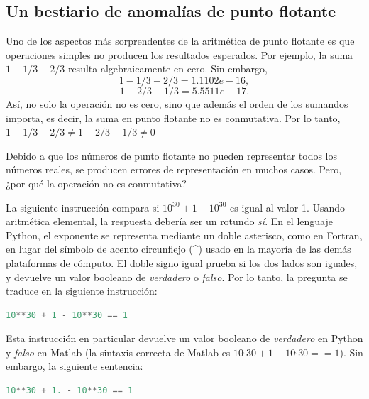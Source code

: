 

\subsection{Un bestiario de anomalías de punto flotante}\label{sec:FloatingPoint}

Uno de los aspectos más sorprendentes de la aritmética de punto flotante es que operaciones simples no producen los resultados esperados. Por ejemplo, la suma $1-1/3-2/3$ resulta algebraicamente en cero. Sin embargo,
{\ttfamily\[
	1-1/3-2/3 = 1.1102e-16,
\]}	{\ttfamily\[
	1-2/3-1/3 = 5.5511e-17.
\]}
Así, no solo la operación no es cero, sino que además el orden de los sumandos importa, es decir, la suma en punto flotante no es conmutativa. Por lo tanto, $1-1/3-2/3 \neq 1-2/3-1/3 \neq 0$

Debido a que los números de punto flotante no pueden representar todos los números reales, se producen errores de representación en muchos casos. Pero, ¿por qué la operación no es conmutativa? \QA %

La siguiente instrucción compara si $10^{30} + 1 - 10^{30}$ es igual al valor 1. Usando aritmética elemental, la respuesta debería ser un rotundo \textit{sí}. En el lenguaje Python, el exponente se representa mediante un doble asterisco, como en Fortran, en lugar del símbolo de acento circunflejo (\^{}) usado en la mayoría de las demás plataformas de cómputo. El doble signo igual prueba si los dos lados son iguales, y devuelve un valor booleano de \textit{verdadero} o \textit{falso}. Por lo tanto, la pregunta se traduce en la siguiente instrucción:

\begin{lstlisting}[language=Python]
	10**30 + 1 - 10**30 == 1
\end{lstlisting}

Esta instrucción en particular devuelve un valor booleano de \textit{verdadero} en Python y \textit{falso} en Matlab (la sintaxis correcta de Matlab es $10\hat{\phantom{.}}30 + 1 - 10\hat{\phantom{.}}30 == 1$). Sin embargo, la siguiente sentencia:

\begin{lstlisting}[language=Python]
	10**30 + 1. - 10**30 == 1
\end{lstlisting}

